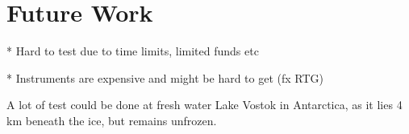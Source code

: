 \chapter{Future Work}

* Hard to test due to time limits, limited funds etc

    * Instruments are expensive and might be hard to get (fx RTG)

A lot of test could be done at fresh water Lake Vostok in Antarctica, as it lies 4 km beneath the ice, but remains unfrozen\citet{iceLink-scott}.
